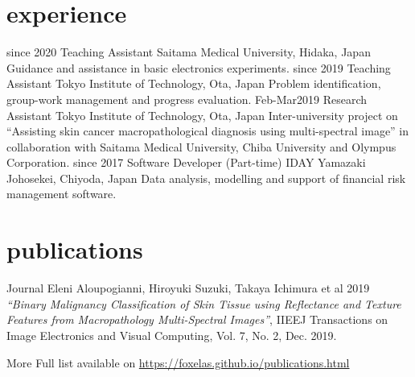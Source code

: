 \documentclass[]{friggeri-cv}
\begin{document}
\section{experience}
\begin{entrylist}
  \entry
    {since 2020}
    {Teaching Assistant}
    {Saitama Medical University, Hidaka, Japan}
    {Guidance and assistance in basic electronics experiments.}
  \entry
    {since 2019}
    {Teaching Assistant}
    {Tokyo Institute of Technology, Ota, Japan}
    {Problem identification, group-work management and progress evaluation.}
  \entry
  	{Feb-Mar2019}
  	{Research Assistant}
  	{Tokyo Institute of Technology, Ota, Japan}
  	{Inter-university project on ``Assisting skin cancer macropathological diagnosis using multi-spectral image'' in collaboration with Saitama Medical University, Chiba University and Olympus Corporation.}
  \entry
    {since 2017}
    {Software Developer (Part-time)}
    {IDAY Yamazaki Johosekei, Chiyoda, Japan} %
    {Data analysis, modelling and support of financial risk management software.}
\begin{comment}  
  \entry
    {since 2017}
    {Private lessons}
    {Part-time Job}
    {\emph{Tutoring Greek, English and Mathematics to elementary grade students.}}
  \entry
    {2018-2019}
    {Global Education Project（GEP）}
    {Occasional Part-time Job}
    {\emph{Facilitating English learning and cultural exchange among Japanese high school students in 1-day programs.}}
  \entry
    {08/2017}
    {English Summer Camp in Nasu}
    {Summer job.}
    {\emph{Camp captain. Facilitating English learning and cultural exchange among Japanese middle school students in a 3-day program.}}
  \entry
    {2007-2016}
    {Municipal Community of Agios Ioannis, Greece}
    {Summer volunteering.}
    {\emph{Secretary \& supervisor in annual children athletic games.}}
\end{comment}
\end{entrylist}

\section{publications}
\begin{entrylist}
  \entry
    {Journal}
    {Eleni Aloupogianni, Hiroyuki Suzuki, Takaya Ichimura et al }
    {2019}
    {\emph{``Binary Malignancy Classification of Skin Tissue using Reflectance and Texture Features from Macropathology Multi-Spectral Images''}, IIEEJ Transactions on Image Electronics and Visual Computing, Vol. 7, No. 2, Dec. 2019.}
	
	\entry 
	{More} 
	{Full list available on}
	{}
	{\url{https://foxelas.github.io/publications.html}}
	
    
\end{entrylist}
 
\end{document}
